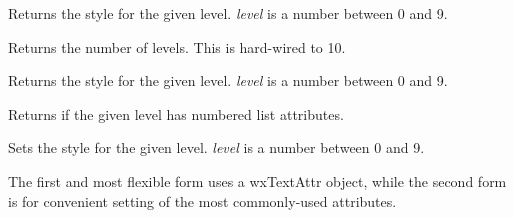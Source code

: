 
Returns the style for the given level. {\it level} is a number between 0 and 9.

\label{wxrichtextliststyledefinitiongetlevelcount}


Returns the number of levels. This is hard-wired to 10.

Returns the style for the given level. {\it level} is a number between 0 and 9.

\label{wxrichtextliststyledefinitionisnumbered}


Returns \true if the given level has numbered list attributes.

\label{wxrichtextliststyledefinitionsetlevelattributes}



Sets the style for the given level. {\it level} is a number between 0 and 9.

The first and most flexible form uses a wxTextAttr object, while the second form is for convenient setting of the most commonly-used attributes.

